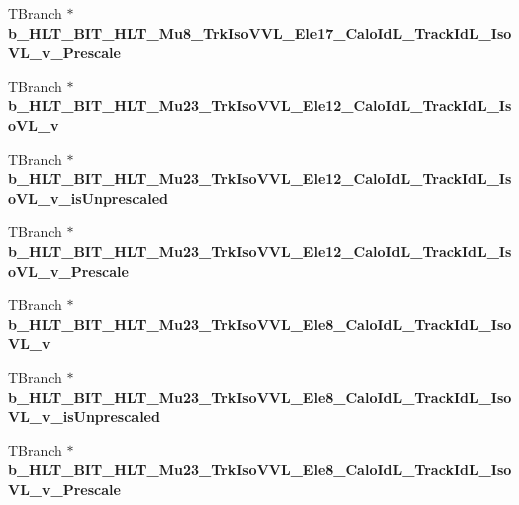 \begin{DoxyCompactItemize}
\item 
\hypertarget{classMiniTree_ada99cd850dadf658f0a2c2109da4986c}{}\label{classMiniTree_ada99cd850dadf658f0a2c2109da4986c} 
T\+Branch $\ast$ {\bfseries b\+\_\+\+H\+L\+T\+\_\+\+B\+I\+T\+\_\+\+H\+L\+T\+\_\+\+Mu8\+\_\+\+Trk\+Iso\+V\+V\+L\+\_\+\+Ele17\+\_\+\+Calo\+Id\+L\+\_\+\+Track\+Id\+L\+\_\+\+Iso\+V\+L\+\_\+v\+\_\+\+Prescale}
\item 
\hypertarget{classMiniTree_ab8e57d90f1c9dba05e41f210473af472}{}\label{classMiniTree_ab8e57d90f1c9dba05e41f210473af472} 
T\+Branch $\ast$ {\bfseries b\+\_\+\+H\+L\+T\+\_\+\+B\+I\+T\+\_\+\+H\+L\+T\+\_\+\+Mu23\+\_\+\+Trk\+Iso\+V\+V\+L\+\_\+\+Ele12\+\_\+\+Calo\+Id\+L\+\_\+\+Track\+Id\+L\+\_\+\+Iso\+V\+L\+\_\+v}
\item 
\hypertarget{classMiniTree_a52b48d62fe010f40eb7024f3a8202b2f}{}\label{classMiniTree_a52b48d62fe010f40eb7024f3a8202b2f} 
T\+Branch $\ast$ {\bfseries b\+\_\+\+H\+L\+T\+\_\+\+B\+I\+T\+\_\+\+H\+L\+T\+\_\+\+Mu23\+\_\+\+Trk\+Iso\+V\+V\+L\+\_\+\+Ele12\+\_\+\+Calo\+Id\+L\+\_\+\+Track\+Id\+L\+\_\+\+Iso\+V\+L\+\_\+v\+\_\+is\+Unprescaled}
\item 
\hypertarget{classMiniTree_a4df3eefcec2094720a6084d8c0294c17}{}\label{classMiniTree_a4df3eefcec2094720a6084d8c0294c17} 
T\+Branch $\ast$ {\bfseries b\+\_\+\+H\+L\+T\+\_\+\+B\+I\+T\+\_\+\+H\+L\+T\+\_\+\+Mu23\+\_\+\+Trk\+Iso\+V\+V\+L\+\_\+\+Ele12\+\_\+\+Calo\+Id\+L\+\_\+\+Track\+Id\+L\+\_\+\+Iso\+V\+L\+\_\+v\+\_\+\+Prescale}
\item 
\hypertarget{classMiniTree_a0c9a361761274d12ac97c60c0323825a}{}\label{classMiniTree_a0c9a361761274d12ac97c60c0323825a} 
T\+Branch $\ast$ {\bfseries b\+\_\+\+H\+L\+T\+\_\+\+B\+I\+T\+\_\+\+H\+L\+T\+\_\+\+Mu23\+\_\+\+Trk\+Iso\+V\+V\+L\+\_\+\+Ele8\+\_\+\+Calo\+Id\+L\+\_\+\+Track\+Id\+L\+\_\+\+Iso\+V\+L\+\_\+v}
\item 
\hypertarget{classMiniTree_a8e49e3efd77c6d862b4f7ef0a68fc1eb}{}\label{classMiniTree_a8e49e3efd77c6d862b4f7ef0a68fc1eb} 
T\+Branch $\ast$ {\bfseries b\+\_\+\+H\+L\+T\+\_\+\+B\+I\+T\+\_\+\+H\+L\+T\+\_\+\+Mu23\+\_\+\+Trk\+Iso\+V\+V\+L\+\_\+\+Ele8\+\_\+\+Calo\+Id\+L\+\_\+\+Track\+Id\+L\+\_\+\+Iso\+V\+L\+\_\+v\+\_\+is\+Unprescaled}
\item 
\hypertarget{classMiniTree_a7534708c811771e5ddc1761a5da48bf7}{}\label{classMiniTree_a7534708c811771e5ddc1761a5da48bf7} 
T\+Branch $\ast$ {\bfseries b\+\_\+\+H\+L\+T\+\_\+\+B\+I\+T\+\_\+\+H\+L\+T\+\_\+\+Mu23\+\_\+\+Trk\+Iso\+V\+V\+L\+\_\+\+Ele8\+\_\+\+Calo\+Id\+L\+\_\+\+Track\+Id\+L\+\_\+\+Iso\+V\+L\+\_\+v\+\_\+\+Prescale}
\item 

\end{DoxyCompactItemize}
